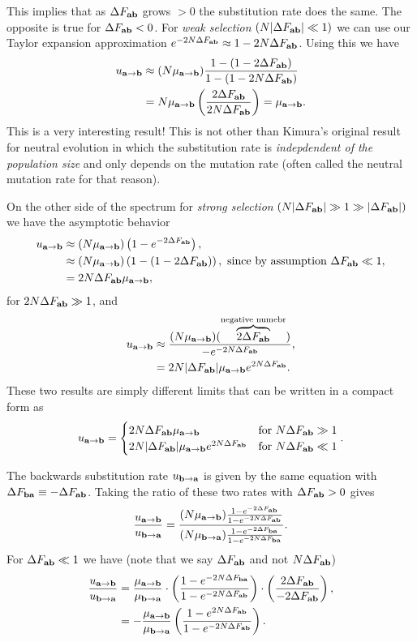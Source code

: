 This implies that as $\DF$ grows $> 0$ the substitution rate does the same. The
opposite is true for $\DF < 0$. For {\it weak selection}
$(N \lvert \DF \rvert \ll 1)$ we can use our Taylor expansion approximation
$e^{-2 N \DF} \approx 1 - 2 N \DF$. Using this we have
\begin{align}
  u_\atob &\approx (N \mu_\atob) {1 - (1 - 2 \DF) \over 1 - (1 - 2 N \DF)}\\
  &= N \mu_\atob \left( 2 \DF \over 2 N \DF \right) = \mu_\atob.
\end{align}
This is a very interesting result! This is not other than Kimura's original
result for neutral evolution in which the substitution rate is {\it
indepdendent of the population size} and only depends on the mutation rate
(often called the neutral mutation rate for that reason).

On the other side of the spectrum for {\it strong selection}
$(N \lvert \DF \rvert \gg 1 \gg \lvert \DF \rvert)$ we have the asymptotic
behavior
\begin{align}
  u_\atob &\approx (N \mu_\atob) \left( 1 - e^{-2 \DF} \right),\\
  &\approx (N \mu_\atob) \left( 1 - (1 - 2 \DF) \right),
  \text{ since by assumption } \DF \ll 1, \\
  &= 2 N \DF \mu_\atob,
\end{align}
for $2 N \DF \gg 1$, and
\begin{align}
  u_\atob &\approx {(N \mu_\atob) (\overbrace{2 \DF}^{\text{negative numebr}})
  \over -e^{-2 N \DF}},\\
  &= 2 N \lvert \DF \rvert \mu_\atob e^{2 N \DF}.
\end{align}
These two results are simply different limits that can be written in a compact
form as
\begin{equation}
  u_\atob =
  \begin{cases}
    2 N \DF \mu_\atob & \text{for } N \DF \gg 1\\
    2 N \lvert \DF \rvert \mu_\atob e^{2 N \DF} & \text{for } N \DF \ll 1
  \end{cases}.
\end{equation}

The backwards substitution rate $u_\btoa$ is given by the same equation with
$\Delta F_{\bb{ba}} \equiv - \DF$. Taking the ratio of these two rates with
$\DF > 0$ gives
\begin{equation}
  {u_\atob \over u_\btoa} = {(N \mu_\atob)
  {1 - e^{-2 \DF} \over 1 - e^{-2 N \DF}} \over
  (N \mu_\btoa) {1 - e^{-2 \Delta F_{\bb{ba}}} \over
  1 - e^{-2 N \Delta F_{\bb{ba}}}}}.
\end{equation}
For $\DF \ll 1$ we have (note that we say $\DF$ and not $N \DF$)
\begin{align}
  {u_\atob \over u_\btoa} &= {\mu_\atob \over \mu_\btoa} \cdot
  \left( {1 - e^{-2 N \Delta F_{\bb{ba}}} \over 1 - e^{-2N \DF}} \right)\cdot
  \left( {2 \DF \over - 2 \DF} \right),\\
  &= - {\mu_\atob \over \mu_\btoa}
  \left( {1 - e^{2 N \DF} \over 1 - e^{-2N \DF}} \right).
\end{align}

